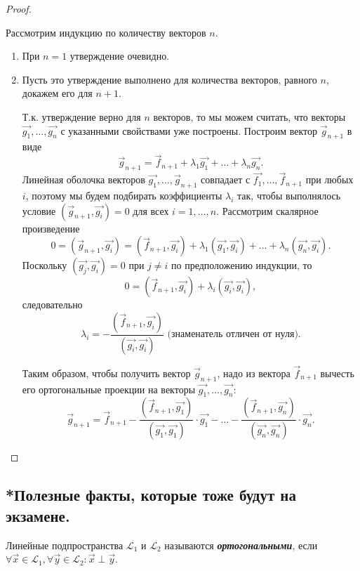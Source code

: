 \begin{proof}~

    Рассмотрим индукцию по количеству векторов $n$.
    \begin{enumerate}
        \item При $n = 1$ утверждение очевидно.
        \item Пусть это утверждение выполнено для количества векторов, равного $n$, докажем его для $n + 1$. 
        
        Т.к. утверждение верно для $n$ векторов, то мы можем считать, что векторы $\vec{g_1}, \ldots, \vec{g_n}$ с указанными свойствами уже построены. Построим вектор $\vec{g}_{n + 1}$ в виде 
        $$\vec{g}_{n + 1} = \vec{f}_{n + 1} + \lambda_1 \vec{g_1} + \ldots + \lambda_n\vec{g_n}.$$ 
        Линейная оболочка векторов $\vec{g_1}, \ldots,  \vec{g}_{n + 1}$ совпадает с $\vec{f_1}, \ldots, \vec{f}_{n + 1}$ при любых $i$, поэтому мы будем подбирать коэффициенты $\lambda_i$ так, чтобы выполнялось условие $(\vec{g}_{n + 1},  \vec{g_i}) = 0$ для всех $i = 1, \ldots, n$. Рассмотрим скалярное произведение $$0 = (\vec{g}_{n + 1}, \vec{g_i}) = (\vec{f}_{n + 1}, \vec{g_i})+ \lambda_1(\vec{g_1}, \vec{g_i}) + \ldots + \lambda_n(\vec{g_n}, \vec{g_i}).$$
        Поскольку $(\vec{g_j}, \vec{g_i}) = 0$ при $j \ne i$ по предположению индукции, то 
        $$0 = (\vec{f}_{n + 1}, \vec{g_i}) + \lambda_i(\vec{g_i}, \vec{g_i}),$$ следовательно 
        $$\lambda_i = -\frac{(\vec{f}_{n + 1}, \vec{g_i})}{(\vec{g_i}, \vec{g_i})} \text{ (знаменатель отличен от нуля).}$$ 
        
        Таким образом, чтобы получить вектор $\vec{g}_{n + 1}$, надо из вектора $\vec{f}_{n + 1}$ вычесть его ортогональные проекции на векторы $\vec{g_1}, \ldots, \vec{g_n}$:
        $$\vec{g}_{n + 1} = \vec{f}_{n + 1} -\frac{(\vec{f}_{n + 1}, \vec{g_1})}{(\vec{g_1}, \vec{g_1})} \cdot \vec{g_1} - \ldots -\frac{(\vec{f}_{n + 1}, \vec{g_n})}{(\vec{g_n}, \vec{g_n})} \cdot \vec{g_n}.$$
    \end{enumerate}
\end{proof}


\newpage


\subsection{*Полезные факты, которые тоже будут на экзамене.}

\begin{definition}
    Линейные подпространства $\mathcal{L}_1$ и $\mathcal{L}_2$ называются \textbf{\textit{ортогональными}}, если $\forall \vec{x} \in \mathcal{L}_1, \forall \vec{y} \in \mathcal{L}_2 \colon \vec{x} \perp \vec{y}$.
\end{definition}

